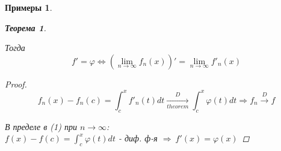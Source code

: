 \documentclass[a4paper, 12pt]{article}
\newtheorem{Examples}{Примеры}
\newtheorem{Thm}{Теорема}
\begin{document}
\begin{Examples}
\begin{enumerate}
\begin{Thm}
\begin{enumerate}
                    \end{enumerate}
                    Тогда
                    \[f' = \varphi
                    \Leftrightarrow (\lim_{n \rightarrow \infty} f_n(x))' =
                    \lim_{n \rightarrow \infty} f'_n(x)\]

                    \begin{proof}
                        \begin{equation}
                            f_n(x) - f_n(c) = \int^{x}_{c} f'_n(t)dt
                            \underset{theorem}{\xrightarrow{D}}
                            \int^{x}_{c} \varphi(t)dt \Rightarrow f_n
                            \xrightarrow{D} f
                        \end{equation}

                        В пределе в (1) при \(n \rightarrow \infty\):\\
                        \(f(x) - f(c) = \int^{x}_{c} \varphi(t)dt\) - диф. ф-я
                        \( \Rightarrow\ f'(x) = \varphi(x)\)
                    \end{proof}
                \end{Thm}
         \end{enumerate}
    \end{Examples}
\end{document}
